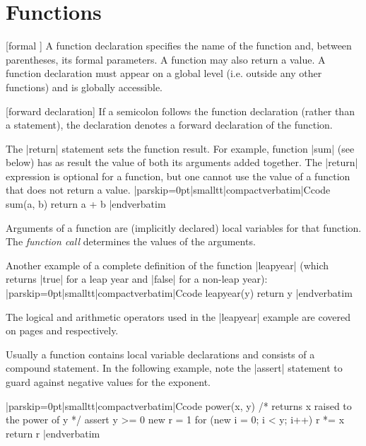\vfill\eject
{}%

\chapter{Functions}
  [formal \midtilde]
A function declaration specifies the name of the function and, between
parentheses, its formal parameters. A function may also return a value. A
function declaration must appear on a global level (i.e. outside any other
functions) and is globally accessible.

 [forward declaration]
\noindent{}%
If a semicolon follows the function declaration (rather than a statement),
the declaration denotes a forward declaration of the function.

The |return| statement sets the function result. For example, function |sum|
(see below) has as result the value of both its arguments added together. The
|return| expression is optional for a function, but one cannot use the value
of a function that does not return a value.
\listingx\verbatim|parskip=0pt|smalltt|compactverbatim|Ccode
sum(a, b)
    return a + b
|endverbatim\endlistingx

Arguments of a function are (implicitly declared) local variables for that
function. The {\it function call\/} determines the values of the arguments.

Another example of a complete definition of the function |leapyear| (which
returns |true| for a leap year and |false| for a non-leap year):  
\listingx\verbatim|parskip=0pt|smalltt|compactverbatim|Ccode
leapyear(y)
    return y %
|endverbatim\endlistingx

The logical and arithmetic operators used in the |leapyear| example are covered
on pages  and  respectively.

\noindent{}%
Usually a function contains local variable declarations and consists of a
compound statement. In the following example, note the |assert| statement to
guard against negative values for the exponent.

\goodbreak
{}
\listingx\verbatim|parskip=0pt|smalltt|compactverbatim|Ccode
power(x, y)
    {
    /* returns x raised to the power of y */
    assert y >= 0
    new r = 1
    for (new i = 0; i < y; i++)
        r *= x
    return r
    }
|endverbatim\endlistingx


